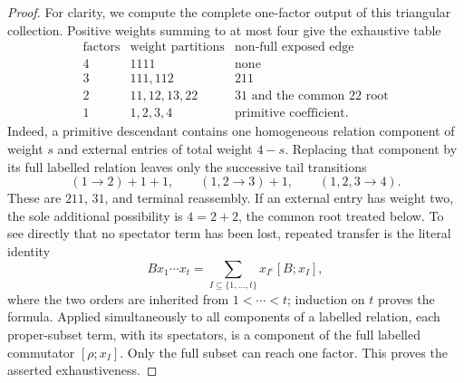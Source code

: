 \documentclass[10pt,a4paper]{amsart}
\theoremstyle{remark}
\begin{document}
\begin{proof}
For clarity, we compute the complete one-factor output of this
triangular collection.  Positive weights summing to at most four give
the exhaustive table
\begin{equation}
\begin{array}{c|c|c}
\text{factors}&\text{weight partitions}&\text{non-full exposed edge}\\ \hline
4&1111&\text{none}\\
3&111,112&211\\
2&11,12,13,22&31\text{ and the common }22\text{ root}\\
1&1,2,3,4&\text{primitive coefficient.}
\end{array}                                                   \label{eq:table}
\end{equation}
Indeed, a primitive descendant contains one homogeneous relation
component of weight $s$ and external entries of total weight $4-s$.
Replacing that component by its full labelled relation leaves only
the successive tail transitions
\[
       (1\longrightarrow2)+1+1,\qquad
       (1,2\longrightarrow3)+1,\qquad
       (1,2,3\longrightarrow4).
\]
These are $211$, $31$, and terminal reassembly.  If an external entry
has weight two, the sole additional possibility is $4=2+2$, the common
root treated below.  To see directly that no spectator term has been
lost, repeated transfer is the literal identity
\begin{equation}
 Bx_1\cdots x_t=
 \sum_{I\subseteq\{1,\ldots,t\}}x_{I^c}[B;x_I],         \label{eq:subsets}
\end{equation}
where the two orders are inherited from $1<\cdots<t$; induction on
$t$ proves the formula.  Applied simultaneously to all components of a
labelled relation, each proper-subset term, with its spectators, is a
component of the full labelled commutator $[\rho;x_I]$.  Only the full
subset can reach one factor.  This proves the asserted exhaustiveness.


\end{proof}
\end{document}
